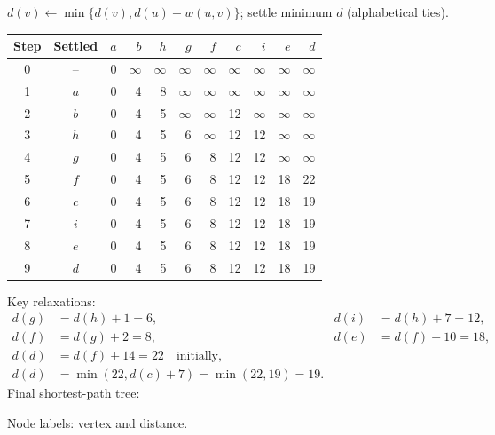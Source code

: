\documentclass[11pt,a4paper]{article}
\begin{document}
$d(v)\leftarrow\min\{d(v),d(u)+w(u,v)\}$; settle minimum $d$ (alphabetical ties).
\begin{center}\small\begin{tabular}{c|c|rrrrrrrrr}\toprule
Step&Settled&$a$&$b$&$h$&$g$&$f$&$c$&$i$&$e$&$d$\\\midrule
0&--&0&$\infty$&$\infty$&$\infty$&$\infty$&$\infty$&$\infty$&$\infty$&$\infty$\\
1&$a$&0&4&8&$\infty$&$\infty$&$\infty$&$\infty$&$\infty$&$\infty$\\
2&$b$&0&4&5&$\infty$&$\infty$&12&$\infty$&$\infty$&$\infty$\\
3&$h$&0&4&5&6&$\infty$&12&12&$\infty$&$\infty$\\
4&$g$&0&4&5&6&8&12&12&$\infty$&$\infty$\\
5&$f$&0&4&5&6&8&12&12&18&22\\
6&$c$&0&4&5&6&8&12&12&18&19\\
7&$i$&0&4&5&6&8&12&12&18&19\\
8&$e$&0&4&5&6&8&12&12&18&19\\
9&$d$&0&4&5&6&8&12&12&18&19\\\bottomrule
\end{tabular}\normalsize\end{center}
Key relaxations:
\begin{align*}
d(g)&=d(h)+1=6,& d(i)&=d(h)+7=12,\\
d(f)&=d(g)+2=8,& d(e)&=d(f)+10=18,\\
d(d)&=d(f)+14=22\quad\text{initially},&&\\
d(d)&=\min(22,d(c)+7)=\min(22,19)=19.&&
\end{align*}
Final shortest-path tree:
\begin{center}\end{center}
Node labels: vertex and distance.
\end{document}
